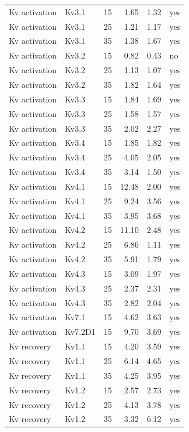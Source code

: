\begin{longtable}{lllrrl}
Kv activation & Kv3.1 & 15 & 1.65 & 1.32 & yes \\
Kv activation & Kv3.1 & 25 & 1.21 & 1.17 & yes \\
Kv activation & Kv3.1 & 35 & 1.38 & 1.67 & yes \\
Kv activation & Kv3.2 & 15 & 0.82 & 0.43 & no \\
Kv activation & Kv3.2 & 25 & 1.13 & 1.07 & yes \\
Kv activation & Kv3.2 & 35 & 1.82 & 1.64 & yes \\
Kv activation & Kv3.3 & 15 & 1.84 & 1.69 & yes \\
Kv activation & Kv3.3 & 25 & 1.58 & 1.57 & yes \\
Kv activation & Kv3.3 & 35 & 2.02 & 2.27 & yes \\
Kv activation & Kv3.4 & 15 & 1.85 & 1.82 & yes \\
Kv activation & Kv3.4 & 25 & 4.05 & 2.05 & yes \\
Kv activation & Kv3.4 & 35 & 3.14 & 1.50 & yes \\
Kv activation & Kv4.1 & 15 & 12.48 & 2.00 & yes \\
Kv activation & Kv4.1 & 25 & 9.24 & 3.56 & yes \\
Kv activation & Kv4.1 & 35 & 3.95 & 3.68 & yes \\
Kv activation & Kv4.2 & 15 & 11.10 & 2.48 & yes \\
Kv activation & Kv4.2 & 25 & 6.86 & 1.11 & yes \\
Kv activation & Kv4.2 & 35 & 5.91 & 1.79 & yes \\
Kv activation & Kv4.3 & 15 & 3.09 & 1.97 & yes \\
Kv activation & Kv4.3 & 25 & 2.37 & 2.31 & yes \\
Kv activation & Kv4.3 & 35 & 2.82 & 2.04 & yes \\
Kv activation & Kv7.1 & 15 & 4.62 & 3.63 & yes \\
Kv activation & Kv7.2D1 & 15 & 9.70 & 3.69 & yes \\
\midrule
Kv recovery & Kv1.1 & 15 & 4.20 & 3.59 & yes \\
Kv recovery & Kv1.1 & 25 & 6.14 & 4.65 & yes \\
Kv recovery & Kv1.1 & 35 & 4.25 & 3.95 & yes \\
Kv recovery & Kv1.2 & 15 & 2.57 & 2.73 & yes \\
Kv recovery & Kv1.2 & 25 & 4.13 & 3.78 & yes \\
Kv recovery & Kv1.2 & 35 & 3.32 & 6.12 & yes \\

\end{longtable}
